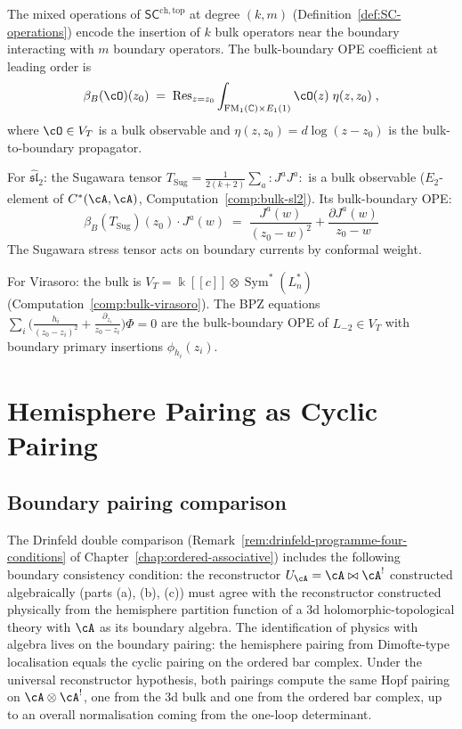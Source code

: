 \begin{construction}
\label{constr:bulk-boundary-ope}
The mixed operations of $\mathsf{SC}^{\mathrm{ch,top}}$ at
degree $(k,m)$ (Definition~\ref{def:SC-operations}) encode the
insertion of $k$ bulk operators near the boundary interacting
with $m$ boundary operators. The bulk-boundary OPE coefficient
at leading order is
\[
\beta_B(\cO)(z_0)
\;=\;
\operatorname{Res}_{z=z_0}
\int_{\mathrm{FM}_1(\mathbb C)\times E_1(1)}
\cO(z)\;\eta(z,z_0)\;,
\]
where $\cO\in V_T$ is a bulk observable and
$\eta(z,z_0)=d\log(z-z_0)$ is the bulk-to-boundary
propagator.

For $\widehat{\mathfrak{sl}}_2$: the Sugawara tensor
$T_{\mathrm{Sug}}=\frac{1}{2(k+2)}\sum_a{:}J^a J^a{:}$
is a bulk observable ($E_2$-element of $C^*(\cA,\cA)$,
Computation~\ref{comp:bulk-sl2}). Its bulk-boundary OPE:
\[
\beta_B(T_{\mathrm{Sug}})(z_0)\cdot J^a(w)
\;=\;
\frac{J^a(w)}{(z_0-w)^2}+\frac{\partial J^a(w)}{z_0-w}
\]
The Sugawara stress tensor acts on boundary currents by
conformal weight.

For Virasoro: the bulk is $V_T=\Bbbk[[c]]\otimes
\operatorname{Sym}^*(L_n^*)$
(Computation~\ref{comp:bulk-virasoro}). The BPZ equations
$\sum_i\bigl(\frac{h_i}{(z_0-z_i)^2}
+\frac{\partial_{z_i}}{z_0-z_i}\bigr)\Phi=0$
are the bulk-boundary OPE of $L_{-2}\in V_T$ with boundary
primary insertions $\phi_{h_i}(z_i)$.
\end{construction}

\section{Hemisphere Pairing as Cyclic Pairing}
\label{sec:hemisphere-cyclic-pairing}

\subsection*{Boundary pairing comparison}

The Drinfeld double comparison
(Remark~\ref{rem:drinfeld-programme-four-conditions} of
Chapter~\ref{chap:ordered-associative}) includes the following
boundary consistency condition: the
reconstructor $U_\cA = \cA \bowtie \cA^!$ constructed
algebraically (parts (a), (b), (c)) must agree with the
reconstructor constructed physically from the hemisphere
partition function of a $3$d holomorphic-topological theory
with $\cA$ as its boundary algebra. The identification of
physics with algebra lives on the boundary pairing: the
hemisphere pairing from Dimofte-type localisation equals the
cyclic pairing on the ordered bar complex. Under the universal
reconstructor hypothesis,
both pairings compute the same Hopf pairing on
$\cA \otimes \cA^!$, one from the $3$d bulk and one from the
ordered bar complex, up to an overall normalisation coming from
the one-loop determinant.

